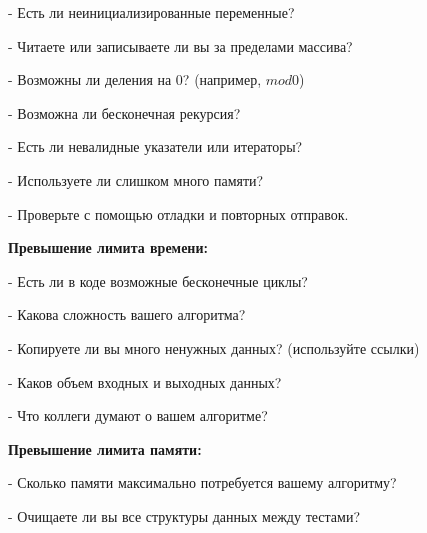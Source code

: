 - Есть ли неинициализированные переменные?  

- Читаете или записываете ли вы за пределами массива?  

- Возможны ли деления на 0? (например, $mod 0$)  

- Возможна ли бесконечная рекурсия?  

- Есть ли невалидные указатели или итераторы?  

- Используете ли слишком много памяти?  

- Проверьте с помощью отладки и повторных отправок.  


\textbf{Превышение лимита времени:}  

- Есть ли в коде возможные бесконечные циклы?  

- Какова сложность вашего алгоритма?  

- Копируете ли вы много ненужных данных? (используйте ссылки)  

- Каков объем входных и выходных данных?

- Что коллеги думают о вашем алгоритме?  


\textbf{Превышение лимита памяти:}  

- Сколько памяти максимально потребуется вашему алгоритму?  

- Очищаете ли вы все структуры данных между тестами?  